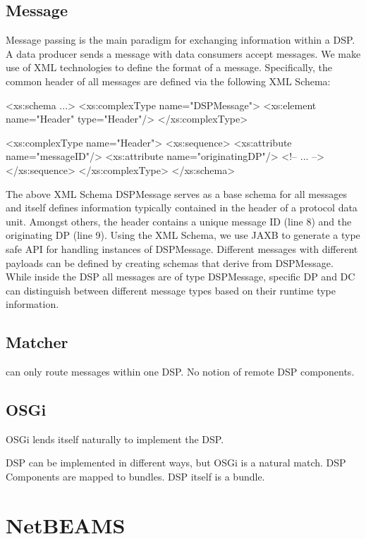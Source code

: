 \documentclass[conference]{IEEEtran}
\begin{document}
\subsection{Message}

Message passing is the main paradigm for exchanging information within
a DSP. A data producer sends a message with data consumers accept
messages. We make use of XML technologies to define the format of a
message. Specifically, the common header of all messages are defined
via the following XML Schema:

\begin{code}
<xs:schema ...>
  <xs:complexType name="DSPMessage">
    <xs:element name="Header" type="Header"/>
  </xs:complexType>

  <xs:complexType name="Header">
    <xs:sequence>
      <xs:attribute name="messageID"/>
      <xs:attribute name="originatingDP"/>
      <!-- ... -->
    </xs:sequence>
  </xs:complexType>
</xs:schema>
\end{code}

The above XML Schema DSPMessage serves as a base schema for all
messages and itself defines information typically contained in the
header of a protocol data unit. Amongst others, the header contains a
unique message ID (line 8) and the originating DP (line 9). Using the
XML Schema, we use JAXB to generate a type safe API for handling
instances of DSPMessage. Different messages with different payloads
can be defined by creating schemas that derive from DSPMessage. While
inside the DSP all messages are of type DSPMessage, specific DP and DC
can distinguish between different message types based on their runtime
type information.


\subsection{Matcher}

can only route messages within one DSP. No notion of remote DSP
components.

\subsection{OSGi}

OSGi lends itself naturally to implement the DSP.

DSP can be implemented in different ways, but OSGi is a natural match.
DSP Components are mapped to bundles. DSP itself is a bundle.


\section{NetBEAMS}
\end{document}
